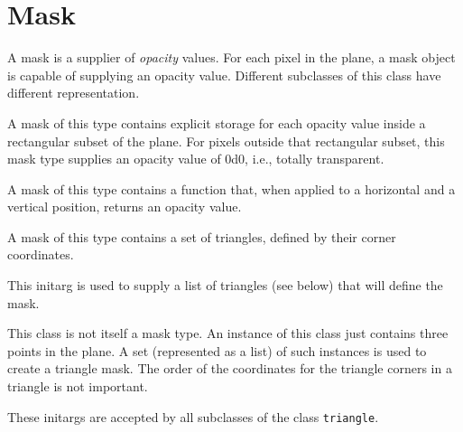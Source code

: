 \chapter{Mask}


A mask is a supplier of \emph{opacity} values.  For each pixel in the
plane, a mask object is capable of supplying an opacity value.
Different subclasses of this class have different representation.


A mask of this type contains explicit storage for each opacity value
inside a rectangular subset of the plane.  For pixels outside that
rectangular subset, this mask type supplies an opacity value of 0d0,
i.e., totally transparent.


A mask of this type contains a function that, when applied to a
horizontal and a vertical position, returns an opacity value.


A mask of this type contains a set of triangles, defined by their
corner coordinates.


This initarg is used to supply a list of triangles (see below) that
will define the mask.


This class is not itself a mask type.  An instance of this class just
contains three points in the plane.  A set (represented as a list) of
such instances is used to create a triangle mask.  The order of the
coordinates for the triangle corners in a triangle is not important.


These initargs are accepted by all subclasses of the class
\texttt{triangle}.
